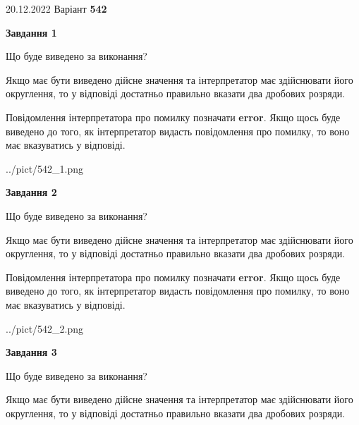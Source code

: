 \documentclass[12pt, ukrainian]{article}
\begin{document}
{20.12.2022 Варіант \No \textbf { 542 }\par}
{
\begin {Large}

{\begin {center}\textbf{Завдання 1}\end {center}}\par
Що буде виведено за виконання? \par

Якщо має бути виведено дійсне значення та інтерпретатор має здійснювати його округлення, 
то у відповіді достатньо правильно вказати два дробових розряди.

Повідомлення інтерпретатора про помилку позначати \textbf{error}.
Якщо щось буде виведено до того, як інтерпретатор видасть повідомлення про помилку, 
то воно має вказуватись у відповіді. \par

\begin{center}
	{../pict/542_1.png}
\end{center}
\newpage

{\begin {center}\textbf{Завдання 2}\end {center}}\par
Що буде виведено за виконання? \par

Якщо має бути виведено дійсне значення та інтерпретатор має здійснювати його округлення, 
то у відповіді достатньо правильно вказати два дробових розряди.

Повідомлення інтерпретатора про помилку позначати \textbf{error}.
Якщо щось буде виведено до того, як інтерпретатор видасть повідомлення про помилку, 
то воно має вказуватись у відповіді. \par

\begin{center}
	{../pict/542_2.png}
\end{center}
\newpage

{\begin {center}\textbf{Завдання 3}\end {center}}\par
Що буде виведено за виконання? \par

Якщо має бути виведено дійсне значення та інтерпретатор має здійснювати його округлення, 
то у відповіді достатньо правильно вказати два дробових розряди.


\end{Large}}
\end{document}
